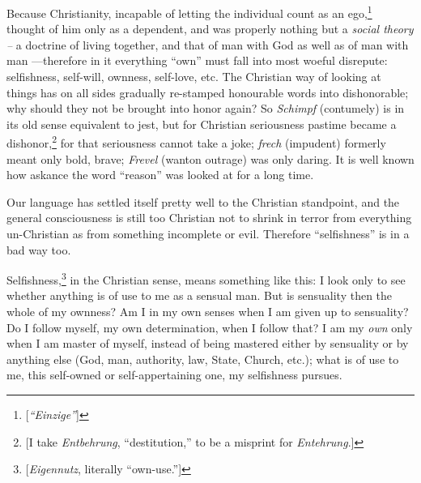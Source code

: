 Because Christianity, incapable of letting the individual count as an 
ego,\footnote{[\textit{``Einzige''}]} thought of him only as a dependent, 
and was properly nothing but a \textit{social theory --} a doctrine of living 
together, and that of man with God as well as of man with man ---therefore in 
it everything ``own'' must fall into most woeful disrepute: selfishness, 
self-will, ownness, self-love, etc. The Christian way of looking at things has 
on all sides gradually re-stamped honourable words into dishonorable; why 
should they not be brought into honor again? So \textit{Schimpf} (contumely) 
is in its old sense equivalent to jest, but for Christian seriousness pastime 
became a dishonor,\footnote{[I take \textit{Entbehrung}, ``destitution,'' to 
be a misprint for \textit{Entehrung}.]} for that seriousness cannot take a 
joke; \textit{frech} (impudent) formerly meant only bold, brave; 
\textit{Frevel} (wanton outrage) was only daring. It is well known how askance 
the word ``reason'' was looked at for a long time.

Our language has settled itself pretty well to the Christian standpoint, and 
the general consciousness is still too Christian not to shrink in terror from 
everything un-Christian as from something incomplete or evil. Therefore 
``selfishness'' is in a bad way too.

Selfishness,\footnote{[\textit{Eigennutz}, literally ``own-use.'']} in the 
Christian sense, means something like this: I look only to see whether 
anything is of use to me as a sensual man. But is sensuality then the whole of 
my ownness? Am I in my own senses when I am given up to sensuality? Do I 
follow myself, my own determination, when I follow that? I am my \textit{own} 
only when I am master of myself, instead of being mastered either by 
sensuality or by anything else (God, man, authority, law, State, Church, 
etc.); what is of use to me, this self-owned or self-appertaining one, my 
selfishness pursues.

